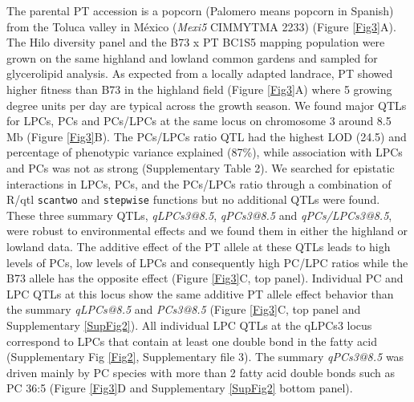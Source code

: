 \documentclass[9pt,twocolumn,twoside,lineno]{BioRxiv}
\def\code#1{\texttt{#1}}
\begin{document}
The parental PT accession is a popcorn (Palomero means popcorn in Spanish) from the Toluca valley in México (\textit{Mexi5} CIMMYTMA 2233) (Figure \ref{Fig3}A). 
The Hilo diversity panel and the B73 x PT BC1S5 mapping population were grown on the same highland and lowland common gardens and sampled for glycerolipid analysis.
As expected from a locally adapted landrace, PT showed higher fitness than B73  in the highland field (Figure \ref{Fig3}A) where 5 growing degree units per day are typical across the growth season.
We found major QTLs for LPCs, PCs and PCs/LPCs at the same locus on chromosome 3 around 8.5 Mb (Figure \ref{Fig3}B). 
The PCs/LPCs ratio QTL had the highest LOD (24.5) and percentage of phenotypic variance explained (87\%), while association with LPCs and PCs was not as strong (Supplementary Table 2).
We searched for epistatic interactions in LPCs, PCs, and the PCs/LPCs ratio through a combination of R/qtl \code{scantwo} and \code{stepwise} functions \cite{Broman2003-ac} but no additional QTLs were found.
These three summary QTLs, \textit{qLPCs3@8.5}, \textit{qPCs3@8.5} and \textit{qPCs/LPCs3@8.5}, were robust to environmental effects and we found them in either the highland or lowland data.
The additive effect of the PT allele at these QTLs leads to high levels of PCs, low levels of LPCs and consequently high PC/LPC ratios while the B73 allele has the opposite effect (Figure \ref{Fig3}C, top panel).
Individual PC and LPC QTLs at this locus show the same additive PT allele effect behavior than the summary \textit{qLPCs@8.5} and \textit{PCs3@8.5} (Figure \ref{Fig3}C, top panel and Supplementary \ref{SupFig2}).
All individual LPC QTLs at the qLPCs3 locus correspond to LPCs that contain at least one double bond in the fatty acid (Supplementary Fig \ref{Fig2}, Supplementary file 3).
The summary \textit{qPCs3@8.5} was driven mainly by PC species with more than 2 fatty acid double bonds such as PC 36:5 (Figure \ref{Fig3}D and Supplementary \ref{SupFig2} bottom panel).
\end{document}
